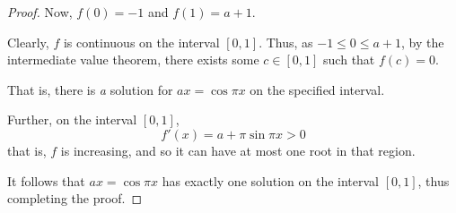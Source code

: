 \begin{enumerate}
\begin{proof}
        Now, $f(0) = -1$ and $f(1) = a + 1$.

        Clearly, $f$ is continuous on the interval $[0, 1]$.
        Thus, as $-1 \leq 0 \leq a+1$, by the intermediate value
        theorem, there exists some $c \in [0, 1]$ such that $f(c) = 0$.

        That is, there is \textit{a} solution for $ax = \cos \pi x$ on
        the specified interval.

        Further, on the interval $[0, 1]$,
        $$f'(x) = a + \pi \sin \pi x > 0$$
        that is, $f$ is increasing, and so it can have at most one root
        in that region.

        It follows that $ax = \cos \pi x$ has exactly one solution on
        the interval $[0, 1]$, thus completing the proof.
    \end{proof}
\end{enumerate}
